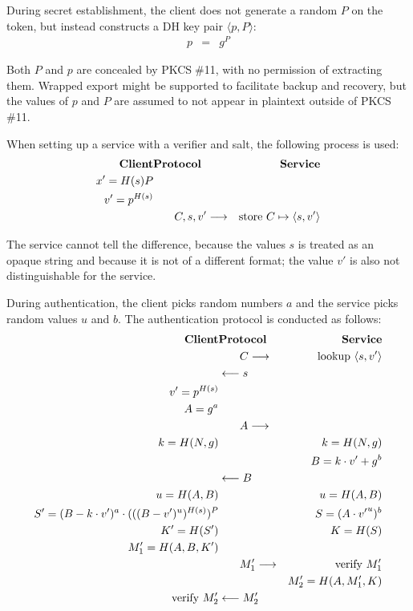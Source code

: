 \documentclass[a4paper,11pt]{article}
\def\pkcs11{PKCS$\;$\#11\xspace}
\def\tol#1{\longleftarrow\strut{}#1\strut\phantom{\longrightarrow}}
\def\tor#1{\phantom{\longleftarrow\strut}#1\strut\longrightarrow}
\begin{document}
During secret establishment, the client does not generate a random $P$ on the token, but instead constructs a DH key pair $\langle p,P\rangle$:
%
\begin{eqnarray*}
p &=& g^P
\end{eqnarray*}

Both $P$ and $p$ are concealed by \pkcs11, with no permission of extracting them.  Wrapped export might be supported to facilitate backup and recovery, but the values of $p$ and $P$ are assumed to not appear in plaintext outside of \pkcs11.

When setting up a service with a verifier and salt, the following process is used:
%
\begin{eqnarray*}
\textbf{Client}&\textbf{Protocol}&\textbf{Service}\\
x'=H(s) P&&\\
v'=p^{H(s)}&&\\
&\tor{C,s,v'}&\textrm{store $C\mapsto\langle s,v'\rangle$}
\end{eqnarray*}

The service cannot tell the difference, because the values $s$ is treated as an opaque string and because it is not of a different format; the value $v'$ is also not distinguishable for the service.

During authentication, the client picks random numbers $a$ and the service picks random values $u$ and $b$.  The authentication protocol is conducted as follows:
%
\begin{eqnarray*}
\textbf{Client}&\textbf{Protocol}&\textbf{Service}\\
&\tor{C}&\textrm{lookup $\langle s,v'\rangle$}\\
&\tol{s}&\\
v'=p^{H(s)}&&\\
A=g^a&&\\
&\tor{A}&\\
k=H(N,g)&&k=H(N,g)\\
&&B=k\cdot v'+g^b\\
&\tol{B}&\\
u=H(A,B)&&u=H(A,B)\\
S'=(B-k\cdot v')^a\cdot (((B-v')^u)^{H(s)})^P && S=(A\cdot {v'}^u)^b\\
K'=H(S')&&K=H(S)\\
M_1'=H(A,B,K')&&\\
&\tor{M_1'}&\textrm{verify $M_1'$}\\
&&M_2'=H(A,M_1',K)\\
\textrm{verify $M_2'$}&\tol{M_2'}&
\end{eqnarray*}
\end{document}
